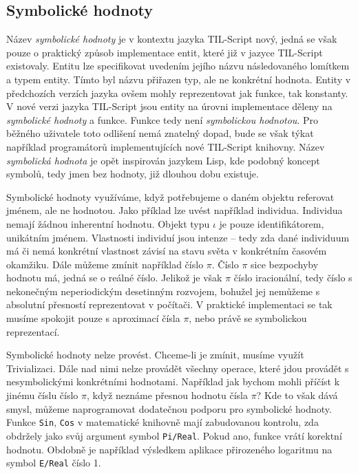 \subsection{Symbolické hodnoty}\label{symbolic-values}

Název \textit{symbolické hodnoty} je v kontextu jazyka TIL-Script nový, jedná se však pouze o
praktický způsob implementace entit, které již v jazyce TIL-Script existovaly. Entitu lze
specifikovat uvedením jejího názvu následovaného lomítkem a typem entity. Tímto byl názvu přiřazen
typ, ale ne konkrétní hodnota. Entity v předchozích verzích jazyka ovšem mohly reprezentovat jak
funkce, tak konstanty. V nové verzi jazyka TIL-Script jsou entity na úrovni implementace děleny
na \textit{symbolické hodnoty} a funkce. Funkce tedy není \textit{symbolickou hodnotou}.
Pro běžného uživatele toto odlišení nemá znatelný dopad, bude se však týkat například programátorů
implementujících nové TIL-Script knihovny. Název \textit{symbolická hodnota} je opět inspirován
jazykem Lisp, kde podobný koncept symbolů, tedy jmen bez hodnoty, již dlouhou dobu existuje.

Symbolické hodnoty využíváme, když potřebujeme o daném objektu referovat jménem, ale ne hodnotou.
Jako příklad lze uvést například individua. Individua nemají žádnou inherentní hodnotu. Objekt
typu $\iota$ je pouze identifikátorem, unikátním jménem. Vlastnosti individuí jsou intenze -- tedy zda
dané individuum má či nemá konkrétní vlastnost závisí na stavu světa v konkrétním časovém okamžiku.
Dále můžeme zmínit například číslo $\pi$. Číslo $\pi$ sice bezpochyby hodnotu má, jedná se o reálné
číslo. Jelikož je však $\pi$ číslo iracionální, tedy číslo s nekonečným neperiodickým desetinným
rozvojem, bohužel jej nemůžeme s absolutní přesností reprezentovat v počítači. V praktické
implementaci se tak musíme spokojit pouze s aproximací čísla $\pi$, nebo právě se symbolickou
reprezentací.

Symbolické hodnoty nelze provést. Chceme-li je zmínit, musíme využít Trivializaci. Dále nad nimi
nelze provádět všechny operace, které jdou provádět s nesymbolickými konkrétními hodnotami.
Například jak bychom mohli příčíst k jinému číslu číslo $\pi$, když neznáme přesnou hodnotu čísla
$\pi$? Kde to však dává smysl, můžeme naprogramovat dodatečnou podporu pro symbolické hodnoty.
Funkce \lstinline{Sin}, \lstinline{Cos} v matematické knihovně mají zabudovanou kontrolu, zda
obdržely jako svůj argument symbol \lstinline{Pi/Real}. Pokud ano, funkce vrátí korektní
hodnotu. Obdobně je například výsledkem aplikace přirozeného logaritmu na symbol \lstinline{E/Real}
číslo 1.

